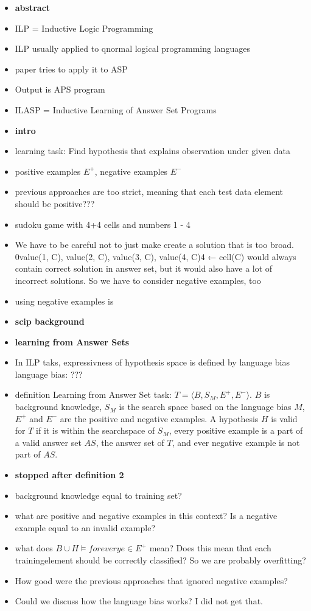\documentclass[runningheads]{llncs}
\begin{document}
\begin{itemize}
    \item \textbf{abstract}
    \item ILP = Inductive Logic Programming 
    \item ILP usually applied to q{normal} logical programming languages
    \item paper tries to apply it to ASP
    \item Output is APS program
    \item ILASP = Inductive Learning of Answer Set Programs
    \item \textbf{intro}
    \item learning task: Find hypothesis that explains observation under given data
    \item positive examples $E^+$, negative examples $E^-$
    \item previous approaches are too strict, meaning that each test data element should be positive???
    \item sudoku game with 4+4 cells and numbers 1 - 4
    \item We have to be careful not to just make create a solution that is too broad. 0{value(1, C), value(2, C), value(3, C), value(4, C)}4 ← cell(C) would always contain correct solution in answer set, but it would also have a lot of incorrect solutions. So we have to consider negative examples, too
    \item using negative examples is 
    \item \textbf{scip background}
    \item \textbf{learning from Answer Sets}
    \item In ILP taks, expressivness of hypothesis space is defined by language bias
    \iten language bias: ???
    \item definition Learning from Answer Set task: $T = \langle B, S_M, E^+, E^- \rangle$. $B$ is background knowledge, $S_M$ is the search space based on the language bias $M$, $E^+$ and $E^-$ are the positive and negative examples. A hypothesis $H$ is valid for $T$ if it is within the searchspace of $S_M$, every positive example is a part of a valid answer set $AS$, the answer set of $T$, and ever negative example is not part of $AS$. 
    \item \textbf{stopped after definition 2}
\end{itemize}

\begin{itemize}
    \item background knowledge equal to training set?
    \item what are positive and negative examples in this context? Is a negative example equal to an invalid example?
    \item what does $B \cup H \vDash for every e \in E^+$ mean? Does this mean that each trainingelement should be correctly classified? So we are probably overfitting?
    \item How good were the previous approaches that ignored negative examples?
    \item Could we discuss how the language bias works? I did not get that. 
\end{itemize}
\end{document}
